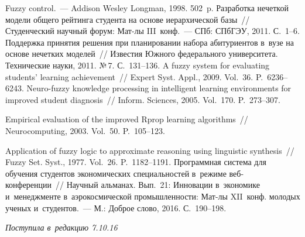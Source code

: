 \begin{multicols}{2}
{\small\frenchspacing
 {%
 \begin{thebibliography}{9}
 Fuzzy control.~--- Addison Wesley 
Longman, 1998. 502~p.
 Разработка нечеткой модели общего рейтинга студента 
на основе иерархической базы~// Студенческий научный форум: Мат-лы 
III~конф.~--- СПб: СПбГЭУ, 2011. С.~1--6.
 Поддержка принятия решения при 
планировании набора абитуриентов в~вузе на основе нечетких моделей~// 
Известия Южного федерального университета. Технические науки, 2011. 
№\,7. С.~131--136.
 A fuzzy system for evaluating students' learning 
achievement~// Expert Syst. Appl., 2009. Vol.~36. P.~6236--6243.
Neuro-fuzzy knowledge processing in intelligent learning environments for 
improved student diagnosis~// Inform. Sciences, 2005. Vol.~170. P.~273--307. 



 Empirical evaluation of the improved Rprop learning 
algorithms~// Neurocomputing, 2003. Vol.~50. P.~105--123.

 Application of fuzzy logic to approximate reasoning using 
linguistic synthesis~// Fuzzy Set. Syst., 1977. Vol.~26. P.~1182--1191.
 Программная система для обучения студентов 
экономических специальностей в~режиме веб-кон\-фе\-рен\-ции~// Научный 
альманах. Вып.~21: Инновации в~экономике и~менеджменте 
в~аэрокосмической промышленности: Мат-лы XII~конф. молодых ученых 
и~студентов.~--- М.: Доброе слово, 2016. С.~190--198.

 \end{thebibliography}

 }
 }

\end{multicols}

\vspace*{-3pt}

\hfill{\small\textit{Поступила в~редакцию 7.10.16}}


\newpage

\vspace*{-24pt}


